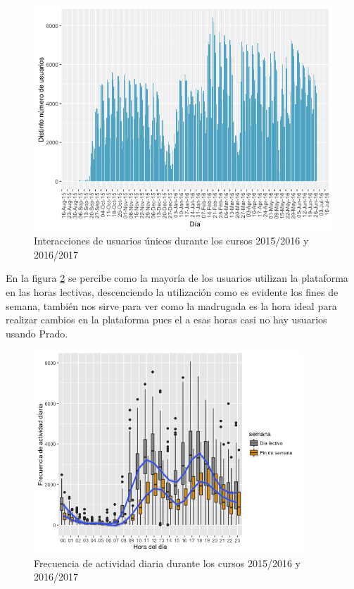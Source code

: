 \begin{figure}[H]
\centering
\includegraphics[width=1.1\textwidth]{../r/distintonumerousuarios}
\caption{Interacciones de usuarios únicos durante los cursos 2015/2016 y 2016/2017}
\label{fig:distintonumerousuarios}
\end{figure}



En la figura \ref{fig:frecuenciaactividaddiaria} se percibe como la mayoría de los usuarios utilizan la plataforma en las horas lectivas, descenciendo la utilización como es evidente los fines de semana, también nos sirve para ver como la madrugada es la hora ideal para realizar cambios en la plataforma pues el a esas horas casi no hay usuarios usando Prado.

\begin{figure}[H]
\centering
\includegraphics[width=0.9\textwidth]{../r/frecuenciaactividaddiaria}
\caption{Frecuencia de actividad diaria durante los cursos 2015/2016 y 2016/2017}
\label{fig:frecuenciaactividaddiaria}
\end{figure}

